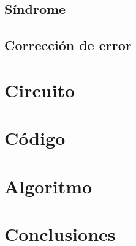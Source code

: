 \documentclass[12pt,letterpaper]{article}
\begin{document}
\subsection{Síndrome}
\subsection{Corrección de error}

\newpage
\section{Circuito}

\newpage
\section{Código}

\newpage
\section{Algoritmo}

\newpage
\section{Conclusiones}
\end{document}
